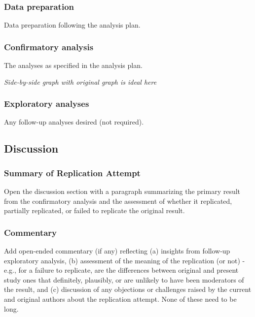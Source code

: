\documentclass[
  letterpaper,
  DIV=11,
  numbers=noendperiod]{scrartcl}
\begin{document}
\subsubsection{Data preparation}\label{data-preparation}

Data preparation following the analysis plan.

\subsubsection{Confirmatory analysis}\label{confirmatory-analysis}

The analyses as specified in the analysis plan.

\emph{Side-by-side graph with original graph is ideal here}

\subsubsection{Exploratory analyses}\label{exploratory-analyses}

Any follow-up analyses desired (not required).

\subsection{Discussion}\label{discussion}

\subsubsection{Summary of Replication
Attempt}\label{summary-of-replication-attempt}

Open the discussion section with a paragraph summarizing the primary
result from the confirmatory analysis and the assessment of whether it
replicated, partially replicated, or failed to replicate the original
result.

\subsubsection{Commentary}\label{commentary}

Add open-ended commentary (if any) reflecting (a) insights from
follow-up exploratory analysis, (b) assessment of the meaning of the
replication (or not) - e.g., for a failure to replicate, are the
differences between original and present study ones that definitely,
plausibly, or are unlikely to have been moderators of the result, and
(c) discussion of any objections or challenges raised by the current and
original authors about the replication attempt. None of these need to be
long.
\end{document}
